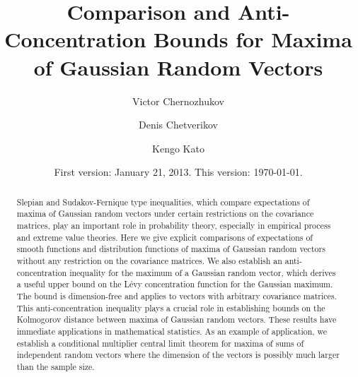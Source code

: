 \documentclass[11pt,reqno]{amsart}
\theoremstyle{definition}
\begin{document}
\title[Comparison and Anti-Concentration]{Comparison and Anti-Concentration Bounds for Maxima of Gaussian Random Vectors}
\author[Chernozhukov]{Victor Chernozhukov}
\author[Chetverikov]{Denis Chetverikov}
\author[Kato]{Kengo Kato}


\address[V. Chernozhukov]{
Department of Economics  \& Operations Research Center, MIT, 50 Memorial Drive, Cambridge, MA 02142, USA.
}

\address[D. Chetverikov]{
Department of Economics, UCLA, Bunche Hall, 8283, 315 Portola Plaza, Los Angeles, CA 90095, USA.
}

\address[K. Kato]{
Graduate School of Economics, University of Tokyo, 7-3-1 Hongo, Bunkyo-ku, Tokyo 113-0033, Japan.
}

\date{First version: January 21, 2013. This version: \today. }

\begin{abstract}
Slepian and Sudakov-Fernique type inequalities, which compare
expectations of maxima of Gaussian random vectors under certain restrictions on the covariance matrices, play an important role in probability
theory, especially in empirical process and extreme value theories.  Here we give
explicit comparisons of expectations of smooth functions and distribution functions of maxima
of Gaussian random vectors without any restriction on the covariance matrices.
We also establish  an anti-concentration inequality
for the maximum of a Gaussian random vector, which derives a useful upper bound
on the L\'{e}vy concentration function for the Gaussian maximum. The bound is dimension-free
and applies to vectors with arbitrary covariance matrices.  This anti-concentration inequality plays a crucial role in establishing bounds on the Kolmogorov distance between maxima of Gaussian random vectors.
These results have immediate applications in mathematical statistics. As an example of application, we establish a conditional  multiplier central limit theorem for maxima of sums of independent random vectors where the dimension of the vectors is  possibly much larger than the sample size.
\end{abstract}
\end{document}
